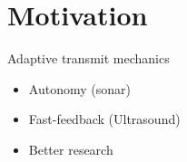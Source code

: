 










%
%

\section{Motivation}


Adaptive
  transmit
  mechanics


\begin{itemize}
\item Autonomy (sonar)
\item Fast-feedback (Ultrasound)
\item Better research
\end{itemize}

